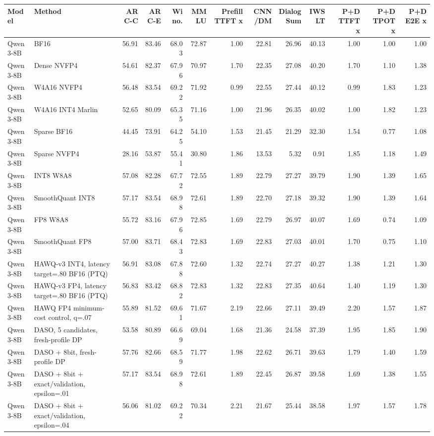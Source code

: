 \begin{tabular}{llrrrrrrrrrrr}
\hline
Model & Method & ARC-C & ARC-E & Wino. & MMLU & Prefill TTFT x & CNN/DM & DialogSum & IWSLT & P+D TTFT x & P+D TPOT x & P+D E2E x \\
\hline
Qwen3-8B & BF16 & 56.91 & 83.46 & 68.03 & 72.87 & 1.00 & 22.81 & 26.96 & 40.13 & 1.00 & 1.00 & 1.00 \\
Qwen3-8B & Dense NVFP4 & 54.61 & 82.37 & 67.96 & 70.97 & 1.70 & 22.35 & 27.08 & 40.20 & 1.70 & 1.10 & 1.38 \\
Qwen3-8B & W4A16 NVFP4 & 56.48 & 83.54 & 69.22 & 71.92 & 0.99 & 22.55 & 27.44 & 40.12 & 0.99 & 1.83 & 1.23 \\
Qwen3-8B & W4A16 INT4 Marlin & 52.65 & 80.09 & 65.35 & 71.16 & 1.00 & 21.96 & 26.35 & 40.02 & 1.00 & 1.82 & 1.23 \\
Qwen3-8B & Sparse BF16 & 44.45 & 73.91 & 64.25 & 54.10 & 1.53 & 21.45 & 21.29 & 32.30 & 1.54 & 0.77 & 1.08 \\
Qwen3-8B & Sparse NVFP4 & 28.16 & 53.87 & 55.41 & 30.80 & 1.86 & 13.53 & 5.32 & 0.91 & 1.85 & 1.18 & 1.49 \\
Qwen3-8B & INT8 W8A8 & 57.08 & 82.28 & 67.72 & 72.55 & 1.89 & 22.79 & 27.27 & 39.79 & 1.90 & 1.39 & 1.65 \\
Qwen3-8B & SmoothQuant INT8 & 57.17 & 83.54 & 68.98 & 72.61 & 1.89 & 22.70 & 27.18 & 39.32 & 1.90 & 1.39 & 1.64 \\
Qwen3-8B & FP8 W8A8 & 55.72 & 83.16 & 67.96 & 72.85 & 1.69 & 22.79 & 26.97 & 40.07 & 1.69 & 0.74 & 1.09 \\
Qwen3-8B & SmoothQuant FP8 & 57.00 & 83.71 & 68.43 & 72.83 & 1.69 & 22.83 & 27.03 & 40.01 & 1.70 & 0.75 & 1.10 \\
Qwen3-8B & HAWQ-v3 INT4, latency target=.80 BF16 (PTQ) & 56.91 & 83.08 & 67.88 & 72.60 & 1.32 & 22.74 & 27.27 & 40.27 & 1.38 & 1.21 & 1.30 \\
Qwen3-8B & HAWQ-v3 FP4, latency target=.80 BF16 (PTQ) & 56.83 & 83.42 & 68.82 & 72.83 & 1.32 & 22.83 & 27.35 & 40.64 & 1.40 & 1.19 & 1.30 \\
Qwen3-8B & HAWQ FP4 minimum-cost control, q=.07 & 55.89 & 81.52 & 69.61 & 71.67 & 2.19 & 22.66 & 27.11 & 39.49 & 2.20 & 1.57 & 1.87 \\
Qwen3-8B & DASO, 5 candidates, fresh-profile DP & 53.58 & 80.89 & 66.69 & 69.04 & 1.68 & 21.36 & 24.58 & 37.39 & 1.95 & 1.85 & 1.90 \\
Qwen3-8B & DASO + 8bit, fresh-profile DP & 57.76 & 82.66 & 68.59 & 71.77 & 1.98 & 22.62 & 26.71 & 39.63 & 1.79 & 1.40 & 1.59 \\
Qwen3-8B & DASO + 8bit + exact/validation, epsilon=.01 & 57.17 & 83.54 & 68.98 & 72.61 & 1.89 & 22.45 & 26.87 & 39.58 & 1.69 & 1.38 & 1.55 \\
Qwen3-8B & DASO + 8bit + exact/validation, epsilon=.04 & 56.06 & 81.02 & 69.22 & 70.34 & 2.21 & 21.67 & 25.44 & 38.58 & 1.97 & 1.57 & 1.78 \\
\hline
\end{tabular}
